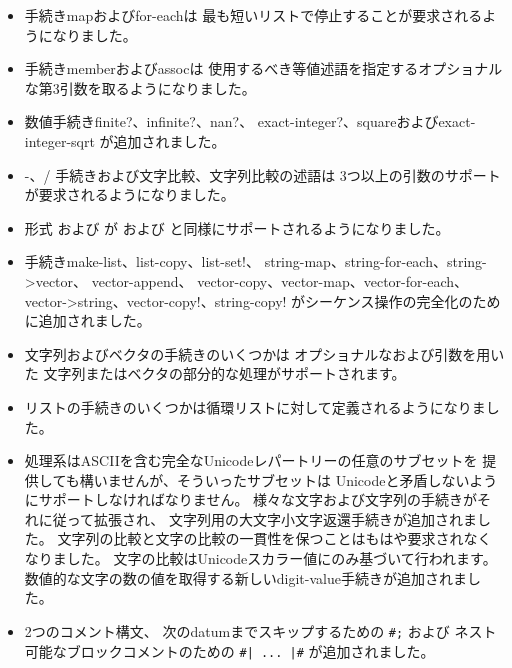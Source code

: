 \begin{itemize}
\item 手続き{\cf map}および{\cf for-each}は
最も短いリストで停止することが要求されるようになりました。

\item 手続き{\cf member}および{\cf assoc}は
使用するべき等値述語を指定するオプショナルな第3引数を取るようになりました。

\item 数値手続き{\cf finite?}、{\cf infinite?}、{\cf nan?}、
{\cf exact-\+integer?}、{\cf square}および{\cf exact-\+integer-\+sqrt}
が追加されました。

\item {\cf -}、{\cf /} 手続きおよび文字比較、文字列比較の述語は
3つ以上の引数のサポートが要求されるようになりました。

\item 形式 \sharptrue{}および \sharpfalse{}が %
\schtrue{}および \schfalse{}と同様にサポートされるようになりました。

\item 手続き{\cf make-\+list}、{\cf list-\+copy}、{\cf list-\+set!}、
{\cf string-\+map}、{\cf string-\+for-\+each}、{\cf string->\+vector}、
{\cf vector-\+append}、
{\cf vector-\+copy}、{\cf vector-\+map}、{\cf vector-\+for-\+each}、
{\cf vector->\+string}、{\cf vector-\+copy!}、{\cf string-\+copy!}
がシーケンス操作の完全化のために追加されました。

\item 文字列およびベクタの手続きのいくつかは
オプショナルなおよび引数を用いた
文字列またはベクタの部分的な処理がサポートされます。

\item リストの手続きのいくつかは循環リストに対して定義されるようになりました。

\item 処理系はASCIIを含む完全なUnicodeレパートリーの任意のサブセットを
提供しても構いませんが、そういったサブセットは
Unicodeと矛盾しないようにサポートしなければなりません。
様々な文字および文字列の手続きがそれに従って拡張され、
文字列用の大文字小文字返還手続きが追加されました。
文字列の比較と文字の比較の一貫性を保つことはもはや要求されなくなりました。
文字の比較はUnicodeスカラー値にのみ基づいて行われます。
数値的な文字の数の値を取得する新しい{\cf digit-value}手続きが追加されました。

\item 2つのコメント構文、
次のdatumまでスキップするための {\tt \#;} および
ネスト可能なブロックコメントのための {\tt \#| ... |\#}
が追加されました。


\end{itemize}
